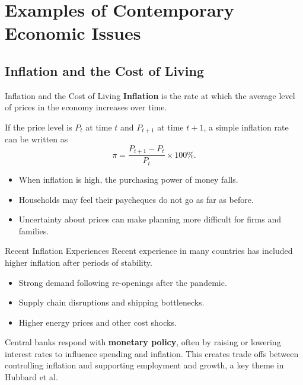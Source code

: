 \documentclass[aspectratio=169]{beamer}
\begin{document}
\section{Examples of Contemporary Economic Issues}

\subsection{Inflation and the Cost of Living}

\begin{frame}{Inflation and the Cost of Living}
  \transfade
  \textbf{Inflation} is the rate at which the average level of prices in the economy increases over time.

  \vspace{0.2cm}
  If the price level is $P_t$ at time $t$ and $P_{t+1}$ at time $t+1$, a simple inflation rate can be written as
  \[
    \pi = \frac{P_{t+1} - P_t}{P_t} \times 100\%.
  \]

  \vspace{0.2cm}
  \begin{itemize}[<+->]
    \item When inflation is high, the purchasing power of money falls.
    \item Households may feel their paycheques do not go as far as before.
    \item Uncertainty about prices can make planning more difficult for firms and families.
  \end{itemize}
\end{frame}

\begin{frame}{Recent Inflation Experiences}
  \transfade
  Recent experience in many countries has included higher inflation after periods of stability.

  \begin{itemize}[<+->]
    \item Strong demand following re-openings after the pandemic.
    \item Supply chain disruptions and shipping bottlenecks.
    \item Higher energy prices and other cost shocks.
  \end{itemize}

  \vspace{0.3cm}
  Central banks respond with \textbf{monetary policy}, often by raising or lowering interest rates
  to influence spending and inflation. This creates trade offs between controlling inflation and
  supporting employment and growth, a key theme in Hubbard et al.
\end{frame}
\end{document}

